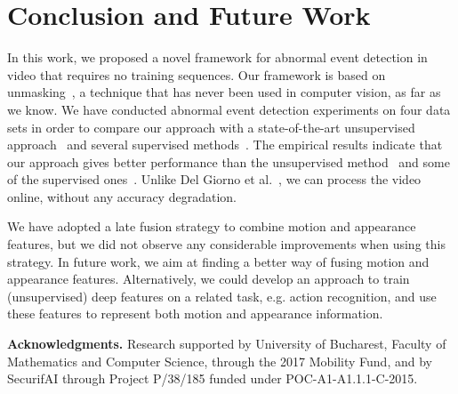 \documentclass[10pt,twocolumn,letterpaper]{article}
\begin{document}
\section{Conclusion and Future Work}
\label{sec_Conclusion}

In this work, we proposed a novel framework for abnormal event detection in video that requires no training sequences. Our framework is based on unmasking~\cite{Koppel-JMLR-2007}, a technique that has never been used in computer vision, as far as we know. We have conducted abnormal event detection experiments on four data sets in order to compare our approach with a state-of-the-art unsupervised approach~\cite{Giorno-ECCV-2016} and several supervised methods~\cite{Cong-CVPR-2011,Kim-CVPR-2009,Lu-ICCV-2013,Mahadevan-CVPR-2010,Mehran-CVPR-2009,Ren-BMVC-2015,Saligrama-CVPR-2012,Sun-PR-2017,Xu-BMVC-2015,Zhang-PR-2016}. The empirical results indicate that our approach gives better performance than the unsupervised method~\cite{Giorno-ECCV-2016} and some of the supervised ones~\cite{Cong-CVPR-2011,Kim-CVPR-2009,Mehran-CVPR-2009}. Unlike Del Giorno et al.~\cite{Giorno-ECCV-2016}, we can process the video online, without any accuracy degradation.

We have adopted a late fusion strategy to combine motion and appearance features, but we did not observe any considerable improvements when using this strategy. In future work, we aim at finding a better way of fusing motion and appearance features. Alternatively, we could develop an approach to train (unsupervised) deep features on a related task, e.g. action recognition, and use these features to represent both motion and appearance information.

\vspace*{0.3cm}
\noindent
{\bf Acknowledgments.}
Research supported by University of Bucharest, Faculty of Mathematics and Computer Science, through the 2017 Mobility Fund, and by SecurifAI through Project P/38/185 funded under POC-A1-A1.1.1-C-2015.

{\small


}
\end{document}
